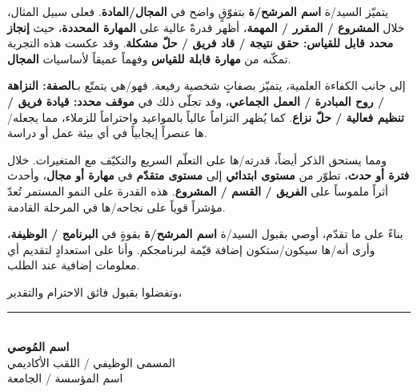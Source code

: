 \documentclass[12pt,a4paper]{article}
\begin{document}
يتميّز السيد/ة \textbf{اسم المرشح/ة} بتفوّقٍ واضح في \textbf{المجال/المادة}. فعلى سبيل المثال، خلال \textbf{المشروع / المقرر / المهمة}، أظهر قدرةً عالية على \textbf{المهارة المحددة}، حيث \textbf{إنجاز محدد قابل للقياس: حقق نتيجة / قاد فريق / حلّ مشكلة}. وقد عكست هذه التجربة تمكّنه من \textbf{مهارة قابلة للقياس} وفهماً عميقاً لأساسيات \textbf{المجال}.

إلى جانب الكفاءة العلمية، يتميّز بصفاتٍ شخصية رفيعة. فهو/هي يتمتّع بـ\textbf{الصفة: النزاهة / روح المبادرة / العمل الجماعي}، وقد تجلّى ذلك في \textbf{موقف محدد: قيادة فريق / تنظيم فعالية / حلّ نزاع}. كما يُظهر التزاماً عالياً بالمواعيد واحتراماً للزملاء، مما يجعله/ها عنصراً إيجابياً في أي بيئة عمل أو دراسة.

ومما يستحق الذكر أيضاً، قدرته/ها على التعلّم السريع والتكيّف مع المتغيرات. خلال \textbf{فترة أو حدث}، تطوّر من \textbf{مستوى ابتدائي} إلى \textbf{مستوى متقدّم} في \textbf{مهارة أو مجال}، وأحدث أثراً ملموساً على \textbf{الفريق / القسم / المشروع}. هذه القدرة على النمو المستمر تُعدّ مؤشراً قوياً على نجاحه/ها في المرحلة القادمة.

\vspace{0.5em}
بناءً على ما تقدّم، أوصي بقبول السيد/ة \textbf{اسم المرشح/ة} بقوةٍ في \textbf{البرنامج / الوظيفة}، وأرى أنه/ها سيكون/ستكون إضافة قيّمة لبرنامجكم. وأنا على استعدادٍ لتقديم أي معلومات إضافية عند الطلب.

\vspace{0.5em}
\begin{flushright}
وتفضلوا بقبول فائق الاحترام والتقدير،
\end{flushright}

\vspace{2em}

\begin{flushright}
\rule{5cm}{0.4pt}\\[0.3em]
\textbf{اسم المُوصي}\\[0.2em]
المسمى الوظيفي / اللقب الأكاديمي\\[0.2em]
اسم المؤسسة / الجامعة\\[0.2em]
 \,\textbar\, 
\end{flushright}
\end{document}
